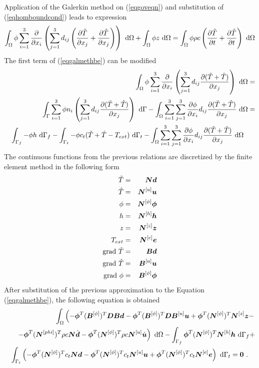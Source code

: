 Application of the Galerkin method on (\ref{eqgoveqn}) and substitution of (\ref{eqhomboundcond}) leads to expression
\begin{eqnarray}\label{eqgalmethbe}
\int_{\Omega} \phi \sum_{i=1}^{3} \mbox{$\displaystyle\frac{\partial{}}{\partial{x_i}}$} \left(\sum_{j=1}^{3} d_{ij}
\left(\mbox{$\displaystyle\frac{\partial{\tilde{T}}}{\partial{x_{j}}}$} + \mbox{$\displaystyle\frac{\partial{\hat{T}}}{\partial{x_{j}}}$}\right)\right) {\ \rm d}\Omega
+ \int_{\Omega} \phi z {\ \rm d}\Omega =
\int_{\Omega} \phi \rho c \left(\mbox{$\displaystyle\frac{\partial{\tilde{T}}}{\partial{t}}$} + \mbox{$\displaystyle\frac{\partial{\hat{T}}}{\partial{t}}$}\right) {\ \rm d}\Omega
\end{eqnarray}
The first term of (\ref{eqgalmethbe}) can be modified
\begin{eqnarray}
&& \int_{\Omega} \phi \sum_{i=1}^{3} \ppd{}{x_i} \left(\sum_{j=1}^{3} d_{ij} \ppd{(\tilde{T}+\hat{T})}{x_{j}}\right) {\ \rm d}\Omega =
\\
&&
\int_{\Gamma} \sum_{i=1}^{3} \phi n_i \left(\sum_{j=1}^{3} d_{ij} \ppd{(\tilde{T}+\hat{T})}{x_{j}}\right) {\ \rm d}\Gamma -
\int_{\Omega} \sum_{i=1}^{3} \sum_{j=1}^{3} \ppd{\phi}{x_{i}} d_{ij} \ppd{(\tilde{T}+\hat{T})}{x_{j}} {\ \rm d}\Omega =
\\
&&
\int_{\Gamma_f} - \phi h {\ \rm d}\Gamma_f -
\int_{\Gamma_t} - \phi c_t (\tilde{T} + \hat{T} - T_{ext}) {\ \rm d}\Gamma_t -
\int_{\Omega} \sum_{i=1}^{3} \sum_{j=1}^{3} \ppd{\phi}{x_{i}} d_{ij} \ppd{(\tilde{T}+\hat{T})}{x_{j}} {\ \rm d}\Omega\ \ \ \ \ 
\end{eqnarray}
The continuous functions from the previous relations are discretized by the finite element method in the following form
\begin{eqnarray}
\tilde{T} &=& \mbox{\boldmath$N$} \mbox{\boldmath$d$}
\\
\hat{T} &=& \mbox{\boldmath$N$}^{[u]} \mbox{\boldmath$u$}
\\
\phi &=& \mbox{\boldmath$N$}^{[\phi]} \mbox{\boldmath$\phi$}
\\
h &=& \mbox{\boldmath$N$}^{[h]} \mbox{\boldmath$h$}
\\
z &=& \mbox{\boldmath$N$}^{[z]} \mbox{\boldmath$z$}
\\
T_{ext} &=& \mbox{\boldmath$N$}^{[e]} \mbox{\boldmath$e$}
\\
{\rm grad}\ \tilde{T} &=& \mbox{\boldmath$B$} \mbox{\boldmath$d$}
\\
{\rm grad}\ \hat{T} &=& \mbox{\boldmath$B$}^{[u]} \mbox{\boldmath$u$}
\\
{\rm grad}\ \phi &=& \mbox{\boldmath$B$}^{[\phi]} \mbox{\boldmath$\phi$}
\end{eqnarray}
After substitution of the previous approximation to the Equation (\ref{eqgalmethbe}), the following equation is obtained
\begin{eqnarray}
&& \int_{\Omega} \left(
- \mbf{\phi}^T (\mbf{B}^{[\phi]})^T \mbf{D} \mbf{B} \mbf{d} 
- \mbf{\phi}^T (\mbf{B}^{[\phi]})^T \mbf{D} \mbf{B}^{[u]} \mbf{u}
+ \mbf{\phi}^T (\mbf{N}^{[\phi]})^T \mbf{N}^{[z]} \mbf{z} -
\right. \\
&& \left. - \mbf{\phi}^T (\mbf{N}^{[phi]})^T \rho c \mbf{N} \dot{\mbf{d}}
- \mbf{\phi}^T (\mbf{N}^{[\phi]})^T \rho c \mbf{N}^{[u]} \dot{\mbf{u}}
\right) {\ \rm d}\Omega -
\int_{\Gamma_f} \mbf{\phi}^T (\mbf{N}^{[\phi]})^T \mbf{N}^{[h]} \mbf{h} {\ \rm d}\Gamma_f +
\\
&& \int_{\Gamma_t} \left(
- \mbf{\phi}^T (\mbf{N}^{[\phi]})^T c_t \mbf{N} \mbf{d}
- \mbf{\phi}^T (\mbf{N}^{[\phi]})^T c_t \mbf{N}^{[u]} \mbf{u}
+ \mbf{\phi}^T (\mbf{N}^{[\phi]})^T c_t \mbf{N}^{[e]} \mbf{e}
\right) {\ \rm d}\Gamma_t = \mbf{0}\ .\ \ \ 
\end{eqnarray}

